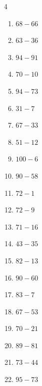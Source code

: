 \begin{multicols}{4}
\begin{enumerate}
  \item $68-66$
        \phantom{$=2$}

  \item $63-36$
        \phantom{$=27$}

  \item $94-91$
        \phantom{$=3$}

  \item $70-10$
        \phantom{$=60$}

  \item $94-73$
        \phantom{$=21$}

  \item $31-7$
        \phantom{$=24$}

  \item $67-33$
        \phantom{$=34$}

  \item $51-12$
        \phantom{$=39$}

  \item $100-6$
        \phantom{$=94$}

  \item $90-58$
        \phantom{$=32$}

  \item $72-1$
        \phantom{$=71$}

  \item $72-9$
        \phantom{$=63$}

  \item $71-16$
        \phantom{$=55$}

  \item $43-35$
        \phantom{$=8$}

  \item $82-13$
        \phantom{$=69$}

  \item $90-60$
        \phantom{$=30$}

\columnbreak %

  \item $83-7$
        \phantom{$=76$}

  \item $67-53$
        \phantom{$=14$}

  \item $70-21$
        \phantom{$=49$}

  \item $89-81$
        \phantom{$=8$}

  \item $73-44$
        \phantom{$=29$}

  \item $95-73$
        \phantom{$=22$}


\end{enumerate}
\end{multicols}
